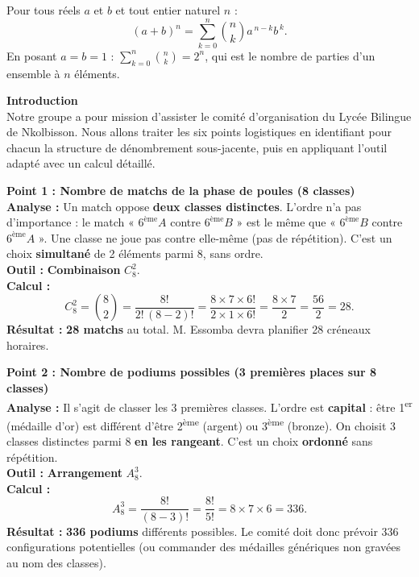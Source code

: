 \documentclass[11pt]{article}
\newcounter{popsec}
\newcounter{popsub}
\newcommand{\courssub}[1]{%
  \stepcounter{popsub}%
  \par\vspace{9pt}\noindent{\popxbold\fontsize{11.5}{13}\selectfont\color{popink}{\color{poporange}\thepopsec.\thepopsub}\hspace{6pt}#1}\par\nopagebreak\vspace{4pt}
}
\begin{document}
\begin{propriete}
Pour tous réels $a$ et $b$ et tout entier naturel $n$ :
\[
(a+b)^n = \sum_{k=0}^{n} \binom{n}{k} a^{\,n-k} b^{\,k}.
\]
En posant $a=b=1$ : $\displaystyle\sum_{k=0}^{n} \binom{n}{k} = 2^n$, qui est le nombre de parties d'un ensemble à $n$ éléments.
\end{propriete}

\courssub{Démarche et corrigé commenté}
\begin{exoresolu}
\noindent \textbf{Introduction}\\
Notre groupe a pour mission d'assister le comité d'organisation du Lycée Bilingue de Nkolbisson. Nous allons traiter les six points logistiques en identifiant pour chacun la structure de dénombrement sous-jacente, puis en appliquant l'outil adapté avec un calcul détaillé.

\tcblower

\noindent \textbf{Point 1 : Nombre de matchs de la phase de poules (8 classes)}\\
\textbf{Analyse :} Un match oppose \textbf{deux classes distinctes}. L'ordre n'a pas d'importance : le match « $6^{\text{ème}}A$ contre $6^{\text{ème}}B$ » est le même que « $6^{\text{ème}}B$ contre $6^{\text{ème}}A$ ». Une classe ne joue pas contre elle-même (pas de répétition). C'est un choix \textbf{simultané} de 2 éléments parmi 8, sans ordre.\\
\textbf{Outil :} \textbf{Combinaison} $C_8^2$.\\
\textbf{Calcul :}
\[
C_8^2 = \binom{8}{2} = \frac{8!}{2!\,(8-2)!} = \frac{8 \times 7 \times 6!}{2 \times 1 \times 6!} = \frac{8 \times 7}{2} = \frac{56}{2} = 28.
\]
\textbf{Résultat :} \textbf{28 matchs} au total. M. Essomba devra planifier 28 créneaux horaires.

\noindent \textbf{Point 2 : Nombre de podiums possibles (3 premières places sur 8 classes)}\\
\textbf{Analyse :} Il s'agit de classer les 3 premières classes. L'ordre est \textbf{capital} : être 1\textsuperscript{er} (médaille d'or) est différent d'être 2\textsuperscript{ème} (argent) ou 3\textsuperscript{ème} (bronze). On choisit 3 classes distinctes parmi 8 \textbf{en les rangeant}. C'est un choix \textbf{ordonné} sans répétition.\\
\textbf{Outil :} \textbf{Arrangement} $A_8^3$.\\
\textbf{Calcul :}
\[
A_8^3 = \frac{8!}{(8-3)!} = \frac{8!}{5!} = 8 \times 7 \times 6 = 336.
\]
\textbf{Résultat :} \textbf{336 podiums} différents possibles. Le comité doit donc prévoir 336 configurations potentielles (ou commander des médailles génériques non gravées au nom des classes).


\end{exoresolu}
\end{document}
